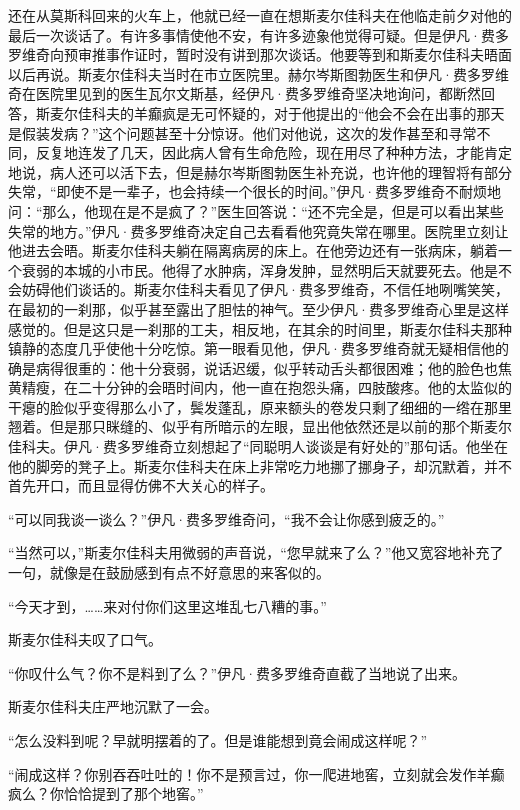 \par 还在从莫斯科回来的火车上，他就已经一直在想斯麦尔佳科夫在他临走前夕对他的最后一次谈话了。有许多事情使他不安，有许多迹象他觉得可疑。但是伊凡·费多罗维奇向预审推事作证时，暂时没有讲到那次谈话。他要等到和斯麦尔佳科夫晤面以后再说。斯麦尔佳科夫当时在市立医院里。赫尔岑斯图勃医生和伊凡·费多罗维奇在医院里见到的医生瓦尔文斯基，经伊凡·费多罗维奇坚决地询问，都断然回答，斯麦尔佳科夫的羊癫疯是无可怀疑的，对于他提出的“他会不会在出事的那天是假装发病？”这个问题甚至十分惊讶。他们对他说，这次的发作甚至和寻常不同，反复地连发了几天，因此病人曾有生命危险，现在用尽了种种方法，才能肯定地说，病人还可以活下去，但是赫尔岑斯图勃医生补充说，也许他的理智将有部分失常，“即使不是一辈子，也会持续一个很长的时间。”伊凡·费多罗维奇不耐烦地问：“那么，他现在是不是疯了？”医生回答说：“还不完全是，但是可以看出某些失常的地方。”伊凡·费多罗维奇决定自己去看看他究竟失常在哪里。医院里立刻让他进去会晤。斯麦尔佳科夫躺在隔离病房的床上。在他旁边还有一张病床，躺着一个衰弱的本城的小市民。他得了水肿病，浑身发肿，显然明后天就要死去。他是不会妨碍他们谈话的。斯麦尔佳科夫看见了伊凡·费多罗维奇，不信任地咧嘴笑笑，在最初的一刹那，似乎甚至露出了胆怯的神气。至少伊凡·费多罗维奇心里是这样感觉的。但是这只是一刹那的工夫，相反地，在其余的时间里，斯麦尔佳科夫那种镇静的态度几乎使他十分吃惊。第一眼看见他，伊凡·费多罗维奇就无疑相信他的确是病得很重的：他十分衰弱，说话迟缓，似乎转动舌头都很困难；他的脸色也焦黄精瘦，在二十分钟的会晤时间内，他一直在抱怨头痛，四肢酸疼。他的太监似的干瘪的脸似乎变得那么小了，鬓发蓬乱，原来额头的卷发只剩了细细的一绺在那里翘着。但是那只眯缝的、似乎有所暗示的左眼，显出他依然还是以前的那个斯麦尔佳科夫。伊凡·费多罗维奇立刻想起了“同聪明人谈谈是有好处的”那句话。他坐在他的脚旁的凳子上。斯麦尔佳科夫在床上非常吃力地挪了挪身子，却沉默着，并不首先开口，而且显得仿佛不大关心的样子。
\par “可以同我谈一谈么？”伊凡·费多罗维奇问，“我不会让你感到疲乏的。”
\par “当然可以，”斯麦尔佳科夫用微弱的声音说，“您早就来了么？”他又宽容地补充了一句，就像是在鼓励感到有点不好意思的来客似的。
\par “今天才到，……来对付你们这里这堆乱七八糟的事。”
\par 斯麦尔佳科夫叹了口气。
\par “你叹什么气？你不是料到了么？”伊凡·费多罗维奇直截了当地说了出来。
\par 斯麦尔佳科夫庄严地沉默了一会。
\par “怎么没料到呢？早就明摆着的了。但是谁能想到竟会闹成这样呢？”
\par “闹成这样？你别吞吞吐吐的！你不是预言过，你一爬进地窖，立刻就会发作羊癫疯么？你恰恰提到了那个地窖。”
